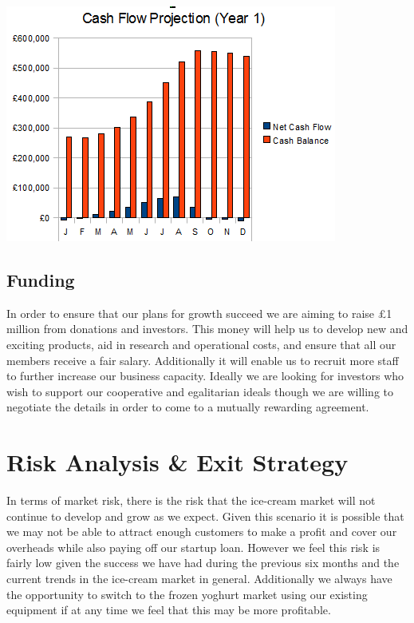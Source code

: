 \documentclass{article}
\begin{document}
\includegraphics[scale=1.0]{cashFlowYear1.png}

\subsection{Funding}

In order to ensure that our plans for growth succeed we are aiming to raise £1 million from donations and investors. This money will help us to develop new and exciting products, aid in research and operational costs, and ensure that all our members receive a fair salary. Additionally it will enable us to recruit more staff to further increase our business capacity. Ideally we are looking for investors who wish to support our cooperative and egalitarian ideals though we are willing to negotiate the details in order to come to a mutually rewarding agreement.

\section{Risk Analysis \& Exit Strategy}

In terms of market risk, there is the risk that the ice-cream market will not continue to develop and grow as we expect. Given this scenario it is possible that we may not be able to attract enough customers to make a profit and cover our overheads while also paying off our startup loan. However we feel this risk is fairly low given the success we have had during the previous six months and the current trends in the ice-cream market in general. Additionally we always have the opportunity to switch to the frozen yoghurt market using our existing equipment if at any time we feel that this may be more profitable. \\
\end{document}
